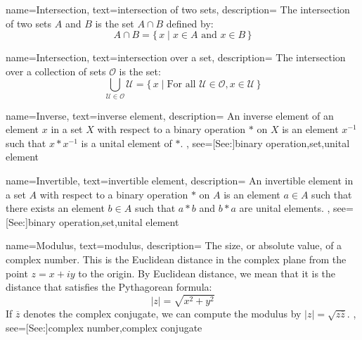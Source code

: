 {
    name={Intersection},
    text={intersection of two sets},
    description={
        The intersection of two sets $A$ and $B$ is the set $A\cap{B}$
        defined by:
        \begin{equation*}
            A\cap{B}=\big\{\,x\;|\;x\in{A}\textrm{ and }x\in{B}\,\big\}
        \end{equation*}
    }
}

{
    name={Intersection},
    text={intersection over a set},
    description={
        The intersection over a collection of sets $\mathcal{O}$ is the set:
        \begin{equation*}
            \bigcup_{\mathcal{U}\in\mathcal{O}}\mathcal{U}
            =\big\{\,x\;|\;\textrm{For all }\mathcal{U}\in\mathcal{O},
                x\in\mathcal{U}\,\big\}
        \end{equation*}
    }
}

{
    name={Inverse},
    text={inverse element},
    description={
        An inverse element of an element $x$ in a set $X$ with respect to a
        binary operation $*$ on $X$ is an element $x^{\minus{1}}$ such that
        $x*x^{\minus{1}}$ is a unital element of $*$.
    },
    see=[See:]{binary operation,set,unital element}
}

{
    name={Invertible},
    text={invertible element},
    description={
        An invertible element in a set $A$ with respect to a binary
        operation $*$ on $A$ is an element $a\in{A}$ such that there
        exists an element $b\in{A}$ such that $a*b$ and $b*a$ are
        unital elements.
    },
    see=[See:]{binary operation,set,unital element}
}

{
    name={Modulus},
    text={modulus},
    description={
        The size, or absolute value, of a complex number. This is the
        Euclidean distance in the complex plane from the point $z=x+iy$
        to the origin. By Euclidean distance, we mean that it is the
        distance that satisfies the Pythagorean formula:
        \begin{equation*}
            |z|=\sqrt{x^{2}+y^{2}}
        \end{equation*}
        If $\overline{z}$ denotes the complex conjugate, we can compute
        the modulus by $|z|=\sqrt{z\overline{z}}$.
    },
    see=[See:]{complex number,complex conjugate}
}

